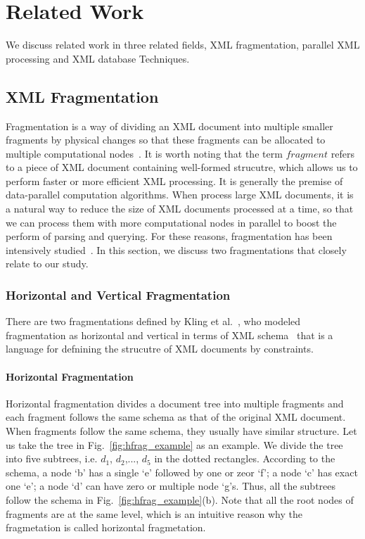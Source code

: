\chapter{Related Work} 
\label{cht:relatedwork}

We discuss related work in three related fields, XML fragmentation,
parallel XML processing and XML database Techniques.

\section{XML Fragmentation}

Fragmentation is a way of dividing an XML document into multiple smaller
fragments by physical changes so that these fragments can be allocated to
multiple computational nodes~\cite{BrMa14}. It is worth noting that the term
$fragment$ refers to a piece of XML document containing well-formed strucutre,
which allows us to perform faster or more efficient XML processing. It is
generally the premise of data-parallel computation algorithms. When process
large XML documents, it is a natural way to reduce the size of XML documents
processed at a time, so that we can process them with more computational nodes
in parallel to boost the perform of parsing and querying. For these reasons,
fragmentation has been intensively studied~\cite{ARBM06,DaGP14, CFKL12,NEMH07,
OgTP13,LiZZ17, CFKL12,DaGP14}. In this section, we discuss  two fragmentations
that closely relate to our study.


\subsection{Horizontal and Vertical Fragmentation}
\label{sec:hfragment}

There are two fragmentations defined by Kling et al.~\cite{kling11:dist_xml},
who modeled fragmentation as horizontal and vertical in terms of XML
schema~\cite{schema} that is a language for defnining the strucutre of XML
documents by constraints.

\subsubsection{Horizontal Fragmentation}
\label{sec:vfragment}

Horizontal fragmentation divides a document tree into multiple fragments and
each fragment follows the same schema as that of the original XML document. When
fragments follow the same schema, they usually have similar structure.  Let us
take the tree in Fig.~\ref{fig:hfrag_example} as an example. We divide the tree
into five subtrees, i.e. $d_1$, $d_2$,..., $d_5$ in the dotted rectangles.
According to the schema, a node `b' has a single `e' followed by one or zeor
`f'; a node `c' has exact one `e'; a node `d' can have zero or multiple node
`g's. Thus, all the subtrees follow the schema in
Fig.~\ref{fig:hfrag_example}(b). Note that all the root nodes of fragments are
at the same level, which is an intuitive reason why the fragmetation is called
horizontal fragmetation.


